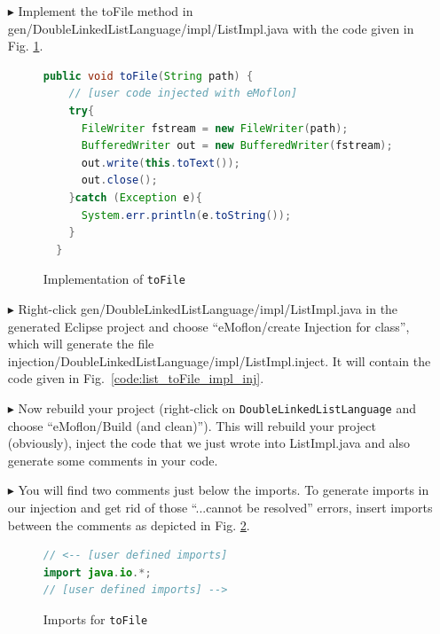 \begin{enumerate}
  \item[$\blacktriangleright$] Implement the \textsf{toFile} method in \textsf{gen/Double\-Linked\-List\-Language/\-impl/\-ListImpl.java} with the code given in Fig. \ref{code:list_toFile_impl_code}.

\begin{figure}[htbp]
\centering
  \begin{lstlisting}[language=Java, keywordstyle={\bfseries\color{purple}}, backgroundcolor=\color{white}]
  public void toFile(String path) {
    // [user code injected with eMoflon]
    try{
      FileWriter fstream = new FileWriter(path);
      BufferedWriter out = new BufferedWriter(fstream);
      out.write(this.toText());
      out.close();
    }catch (Exception e){
      System.err.println(e.toString());
    }
  }
  \end{lstlisting}
\caption{Implementation of \texttt{toFile}}
\label{code:list_toFile_impl_code}
\end{figure}

  \item[$\blacktriangleright$] Right-click \textsf{gen/Double\-Linked\-List\-Language/\-impl/\-ListImpl.java} in the generated Eclipse project and choose ``eMoflon/create Injection for class'', which will generate the file \textsf{injection/DoubleLinkedListLanguage/impl/ListImpl.inject}.
	It will contain the code given in Fig.~\ref{code:list_toFile_impl_inj}.
  \item[$\blacktriangleright$] Now rebuild your project (right-click on \texttt{DoubleLinkedListLanguage} and choose ``eMoflon/Build (and clean)''). This will rebuild your project (obviously), inject the code that we just wrote into \textsf{ListImpl.java} and also generate some comments in your code.
  \item[$\blacktriangleright$] You will find two comments just below the imports. To generate imports in our injection and get rid of those ``...cannot be resolved'' errors, insert imports between the comments as depicted in Fig. \ref{code:imports_toFile}.
\begin{figure}[htbp]
\centering
  \begin{lstlisting}[language=Java, keywordstyle={\bfseries\color{purple}}, backgroundcolor=\color{white}]
// <-- [user defined imports]
import java.io.*;
// [user defined imports] -->
  \end{lstlisting}
\caption{Imports for \texttt{toFile}}
\label{code:imports_toFile}
\end{figure}


\end{enumerate}
